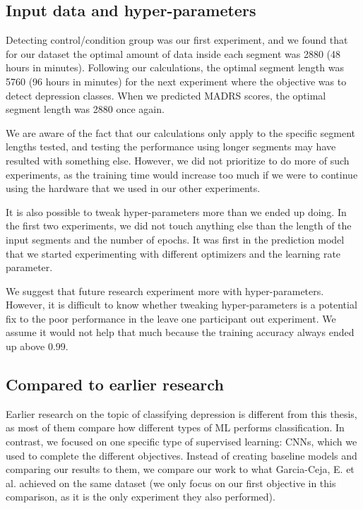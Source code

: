 \subsection{Input data and hyper-parameters}
Detecting control/condition group was our first experiment, and we found that for our dataset the optimal amount of data inside each segment was 2880 (48 hours in minutes). Following our calculations, the optimal segment length was 5760 (96 hours in minutes) for the next experiment where the objective was to detect depression classes. When we predicted MADRS scores, the optimal segment length was 2880 once again. 

We are aware of the fact that our calculations only apply to the specific segment lengths tested, and testing the performance using longer segments may have resulted with something else. However, we did not prioritize to do more of such experiments, as the training time would increase too much if we were to continue using the hardware that we used in our other experiments. 

It is also possible to tweak hyper-parameters more than we ended up doing. In the first two experiments, we did not touch anything else than the length of the input segments and the number of epochs. It was first in the prediction model that we started experimenting with different optimizers and the learning rate parameter. 

We suggest that future research experiment more with hyper-parameters. However, it is difficult to know whether tweaking hyper-parameters is a potential fix to the poor performance in the leave one participant out experiment. We assume it would not help that much because the training accuracy always ended up above 0.99. 

\subsection{Compared to earlier research}
Earlier research on the topic of classifying depression is different from this thesis, as most of them compare how different types of ML performs classification. In contrast, we focused on one specific type of supervised learning: CNNs, which we used to complete the different objectives. Instead of creating baseline models and comparing our results to them, we compare our work to what Garcia-Ceja, E. et al. achieved on the same dataset \cite{GarciaCeja2018_classification_bipolar} (we only focus on our first objective in this comparison, as it is the only experiment they also performed). 

